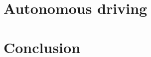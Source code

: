 \documentclass[acmsmall]{acmart}
\begin{document}
\section{Autonomous driving}

\section{Conclusion}





\end{document}
